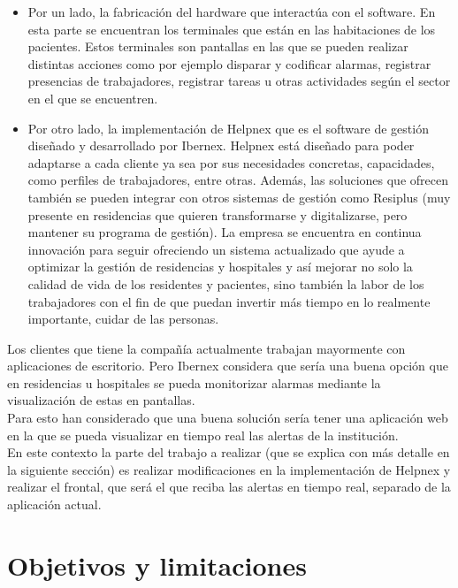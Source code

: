 \begin{itemize}
    \item Por un lado, la fabricación del hardware que interactúa con el software. En esta parte se encuentran los terminales que están en las habitaciones de los pacientes. Estos terminales son pantallas en las que se pueden realizar distintas acciones como por ejemplo disparar y codificar alarmas, registrar presencias de trabajadores, registrar tareas u otras actividades según el sector en el que se encuentren.
    \item Por otro lado, la implementación de Helpnex que es el software de gestión diseñado y desarrollado por Ibernex. Helpnex está diseñado para poder adaptarse a cada cliente ya sea por sus necesidades concretas, capacidades, como perfiles de trabajadores, entre otras.
    Además, las soluciones que ofrecen también se pueden integrar con otros sistemas de gestión como Resiplus (muy presente en residencias que quieren transformarse y digitalizarse, pero mantener su programa de gestión). 
    La empresa se encuentra en continua innovación para seguir ofreciendo un sistema actualizado que ayude a optimizar la gestión de residencias y hospitales y así mejorar no solo la calidad de vida de los residentes y pacientes, sino también la labor de los trabajadores con el fin de que puedan invertir más tiempo en lo realmente importante, cuidar de las personas.
\end{itemize}



Los clientes que tiene la compañía actualmente trabajan mayormente con aplicaciones de escritorio. Pero Ibernex considera que sería una buena opción que en residencias u hospitales se pueda monitorizar alarmas mediante la visualización de estas en pantallas.\\

Para esto han considerado que una buena solución sería tener una aplicación web en la que se pueda visualizar en tiempo real las alertas de la institución.\\

En este contexto la parte del trabajo a realizar (que se explica con más detalle en la siguiente sección) es realizar modificaciones en la implementación de Helpnex y realizar el frontal, que será el que reciba las alertas en tiempo real, separado de la aplicación actual. 


\section{Objetivos y limitaciones}
\label{section-objetivos}

